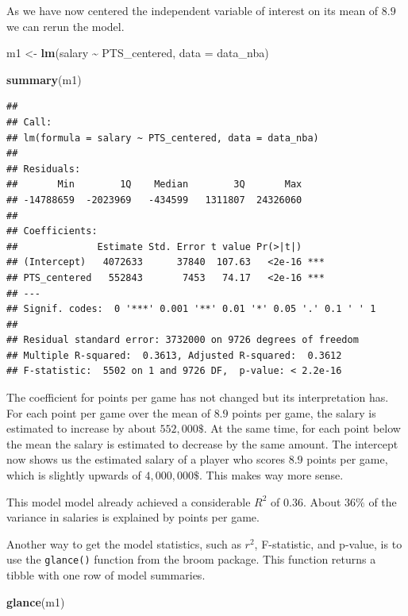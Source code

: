 \documentclass[
]{book}
\newenvironment{Shaded}{\begin{snugshade}}{\end{snugshade}}
\newcommand{\AttributeTok}[1]{\textcolor[rgb]{0.13,0.29,0.53}{#1}}
\newcommand{\FunctionTok}[1]{\textcolor[rgb]{0.13,0.29,0.53}{\textbf{#1}}}
\newcommand{\NormalTok}[1]{#1}
\newcommand{\OtherTok}[1]{\textcolor[rgb]{0.56,0.35,0.01}{#1}}
\newcommand{\SpecialCharTok}[1]{\textcolor[rgb]{0.81,0.36,0.00}{\textbf{#1}}}
\begin{document}
As we have now centered the independent variable of interest on its mean of \(8.9\)
we can rerun the model.

\begin{Shaded}
\begin{Highlighting}[]
\NormalTok{m1 }\OtherTok{\textless{}{-}} \FunctionTok{lm}\NormalTok{(salary }\SpecialCharTok{\textasciitilde{}}\NormalTok{ PTS\_centered, }\AttributeTok{data =}\NormalTok{ data\_nba)}

\FunctionTok{summary}\NormalTok{(m1)}
\end{Highlighting}
\end{Shaded}

\begin{verbatim}
## 
## Call:
## lm(formula = salary ~ PTS_centered, data = data_nba)
## 
## Residuals:
##       Min        1Q    Median        3Q       Max 
## -14788659  -2023969   -434599   1311807  24326060 
## 
## Coefficients:
##              Estimate Std. Error t value Pr(>|t|)    
## (Intercept)   4072633      37840  107.63   <2e-16 ***
## PTS_centered   552843       7453   74.17   <2e-16 ***
## ---
## Signif. codes:  0 '***' 0.001 '**' 0.01 '*' 0.05 '.' 0.1 ' ' 1
## 
## Residual standard error: 3732000 on 9726 degrees of freedom
## Multiple R-squared:  0.3613, Adjusted R-squared:  0.3612 
## F-statistic:  5502 on 1 and 9726 DF,  p-value: < 2.2e-16
\end{verbatim}

The coefficient for points per game has not changed but its interpretation has.
For each point per game over the mean of \(8.9\) points per game, the salary is
estimated to increase by about \(552,000\$\). At the same time, for each point
below the mean the salary is estimated to decrease by the same amount.
The intercept now shows us the estimated salary of a player who scores \(8.9\)
points per game, which is slightly upwards of \(4,000,000\$\). This makes way more
sense.

This model model already achieved a considerable \(R^2\) of \(0.36\). About \(36\%\)
of the variance in salaries is explained by points per game.

Another way to get the model statistics, such as \(r^2\), F-statistic, and p-value, is to use the \texttt{glance()} function from the broom package. This function returns a tibble with one row of model summaries.

\begin{Shaded}
\begin{Highlighting}[]
\FunctionTok{glance}\NormalTok{(m1)}
\end{Highlighting}
\end{Shaded}
\end{document}
